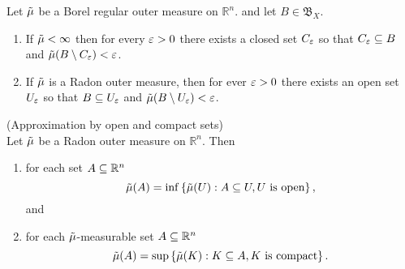 \begin{lemma}\cite[lemma 1]{evans1991measure}
  Let $\tilde{\mu}$ be a Borel regular outer measure on $ \mathbb{R}^n$. and let
  $B\in \mathfrak{B}_X$.
  \begin{enumerate}
    \item If $\tilde{\mu} < \infty$ then for every $\varepsilon>0$ there exists a closed
      set $C_\varepsilon$ so that $C_\varepsilon \subseteq B$ and $\tilde{\mu}(B\setminus C_\varepsilon)<\varepsilon$.
    \item If $\tilde{\mu}$ is a Radon outer measure, then for ever $\varepsilon>0$ there
      exists an open set $U_\varepsilon$ so that $B\subseteq U_\varepsilon$ and
    $\tilde{\mu}(B\setminus U_\varepsilon)< \varepsilon$.
  \end{enumerate}
\end{lemma}

\begin{thm}\cite[thm 4]{evans1991measure}(Approximation by open and
  compact sets)\\
  Let $\tilde{\mu}$ be a Radon outer measure on $\mathbb{R}^n$. Then
  \begin{enumerate}
    \item for each set $A\subseteq \mathbb{R}^n$
      \begin{equation*}
        \tilde{\mu}(A) = \inf\left\{ \tilde{\mu}(U):A\subseteq U, U \text{ is open} \right\},
      \end{equation*}
      and
    \item for each $\tilde{\mu}$-measurable set $A\subseteq \mathbb{R}^n$
      \begin{equation*}
        \tilde{\mu}(A) = \sup\left\{ \tilde{\mu}(K):K\subseteq A, K \text{ is compact}
      \right\}.
      \end{equation*}
  \end{enumerate}
\end{thm}



